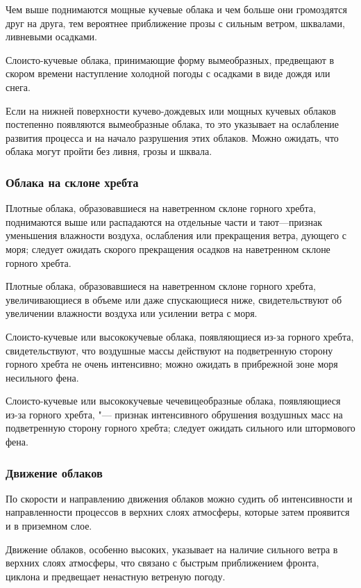 Чем выше поднимаются мощные кучевые облака и чем больше они
громоздятся друг на друга, тем вероятнее приближение прозы с сильным
ветром, шквалами, ливневыми осадками.

 Слоисто-кучевые облака, принимающие форму вымеобразных,
предвещают в скором времени наступление холодной погоды с осадками в
виде дождя или снега.

 Если на нижней поверхности кучево-дождевых или мощных кучевых
облаков постепенно появляются вымеобразные облака, то это указывает на
ослабление развития процесса и на начало разрушения этих
облаков. Можно ожидать, что облака могут пройти без ливня, грозы и
шквала.

\subsubsection{Облака на склоне хребта}

 Плотные облака, образовавшиеся на наветренном склоне горного
хребта, поднимаются выше или распадаются на отдельные части и
тают—признак уменьшения влажности воздуха, ослабления или прекращения
ветра, дующего с моря; следует ожидать скорого прекращения осадков на
наветренном склоне горного хребта.

 Плотные облака, образовавшиеся на наветренном склоне горного
хребта, увеличивающиеся в объеме или даже спускающиеся ниже,
свидетельствуют об увеличении влажности воздуха или усилении ветра с
моря.

 Слоисто-кучевые или высококучевые облака, появляющиеся из-за
горного хребта, свидетельствуют, что воздушные массы действуют на
подветренную сторону горного хребта не очень интенсивно; можно ожидать
в прибрежной зоне моря несильного фена.

 Слоисто-кучевые или высококучевые чечевицеобразные облака,
появляющиеся из-за горного хребта, "--- признак интенсивного обрушения
воздушных масс на подветренную сторону горного хребта; следует ожидать
сильного или штормового фена.

\subsubsection{Движение облаков}

По скорости и направлению движения облаков можно судить об
интенсивности и направленности процессов в верхних слоях атмосферы,
которые затем проявится и в приземном слое.

 Движение облаков, особенно высоких, указывает на наличие
сильного ветра в верхних слоях атмосферы, что связано с быстрым
приближением фронта, циклона и предвещает ненастную ветреную погоду.

